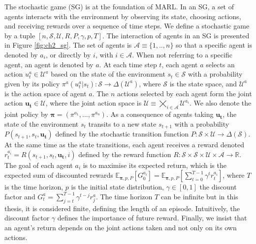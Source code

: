 The stochastic game (SG) \citep{stochasticGames} is at the foundation of MARL.
In an SG, a set of agents interacts with the environment by observing its state, choosing actions, and receiving rewards over a sequence of time steps.
We define a stochastic game by a tuple $[n, \mathcal{S}, \mathcal{U}, R, P, \gamma, p, T]$.
The interaction of agents in an SG is presented in Figure \ref{fig:ch2_sg}.
The set of agents is $\mathcal{A} \equiv \{1,..,n\}$ so that a specific agent is denoted by $a_i$,  or directly by $i$, with $i \in \mathcal{A}$.
When not referring to a specific agent, an agent is denoted by $a$.
At each time step $t$, each agent $a$ selects an action $u_t^a \in \mathcal{U}^a$ based on the state of the environment $s_t \in \mathcal{S}$ with a probability given by its policy $\pi^a(u^a_t|s_t): \mathcal{S} \rightarrow \Delta(\mathcal{U}^a)$, where $\mathcal{S}$ is the state space, and $\mathcal{U}^a$ is the action space of agent $a$.
The $n$ actions selected by each agent form the joint action $\mathbf{u_t} \in \mathcal{U}$, where the joint action space is $\mathcal{U} \equiv \bigtimes_{i \in \mathcal{A}} \mathcal{U}^{a_i}$.
We also denote the joint policy by $\mathbf{\pi} = (\pi^{a_1},...,\pi^{a_n})$.
As a consequence of agents taking $\mathbf{u_t}$, the state of the environment $s_t$ transits to a new state $s_{t+1}$ with a probability $P(s_{t+1}, s_t, \mathbf{u_t})$ defined by the stochastic transition function $P:\mathcal{S} \times \mathcal{U} \rightarrow \Delta(\mathcal{S})$.
At the same time as the state transitions, each agent receives a reward denoted $r_t^{a_i} = R(s_{t+1}, s_t, \mathbf{u_t}, i)$ defined by the reward function $R: \mathcal{S} \times \mathcal{S} \times \mathcal{U} \times \mathcal{A} \rightarrow \mathbb{R}$.
The goal of each agent $a_i$ is to maximise its expected return, which is the expected sum of discounted rewards $\mathbb{E}_{\mathbf{\pi}, p, P}\left[ G_0^{a_i} \right] =\mathbb{E}_{\mathbf{\pi}, p, P}\left[ \sum_{t=0}^{T-1} \gamma^t r^{a_i}_t \right]$, where $T$ is the time horizon, $p$ is the initial state distribution, $\gamma \in [0, 1]$ the discount factor and $G^a_t= \sum_{j=t}^{T-1} \gamma^{t-j} r^a_{j}$.
The time horizon $T$ can be infinite but in this thesis, it is considered finite, defining the length of an episode.
Intuitively, the discount factor $\gamma$ defines the importance of future reward.
Finally, we insist that an agent's return depends on the joint actions taken and not only on its own actions.

